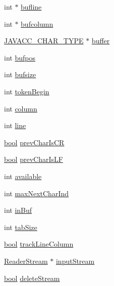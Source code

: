 \begin{DoxyCompactItemize}
\item 
int $\ast$ \hyperlink{classvhdl_1_1parser_1_1_char_stream_a6b825e1a3515c2d88228264d624d0379}{bufline}
\item 
int $\ast$ \hyperlink{classvhdl_1_1parser_1_1_char_stream_a3864d2bf9e3cfa405cab2026076cc3ad}{bufcolumn}
\item 
\hyperlink{_java_c_c_8h_a401fffd20e03e2993f9588187b65afc3}{J\+A\+V\+A\+C\+C\+\_\+\+C\+H\+A\+R\+\_\+\+T\+Y\+P\+E} $\ast$ \hyperlink{classvhdl_1_1parser_1_1_char_stream_a0214083112fc3ba8c31530cd83e8800d}{buffer}
\item 
int \hyperlink{classvhdl_1_1parser_1_1_char_stream_aa2cbb8b449e060850a7de5632f30cc25}{bufpos}
\item 
int \hyperlink{classvhdl_1_1parser_1_1_char_stream_a10f6a94a722bf34e5618d41d6072dbee}{bufsize}
\item 
int \hyperlink{classvhdl_1_1parser_1_1_char_stream_aa9408d80c650063cb31f81c9a6cd590e}{token\+Begin}
\item 
int \hyperlink{classvhdl_1_1parser_1_1_char_stream_a50828bf79317ddff0b210023624b99ff}{column}
\item 
int \hyperlink{classvhdl_1_1parser_1_1_char_stream_a1ec713a583a0ff2f32092c39101d14cb}{line}
\item 
\hyperlink{qglobal_8h_a1062901a7428fdd9c7f180f5e01ea056}{bool} \hyperlink{classvhdl_1_1parser_1_1_char_stream_a3896c04ca5e2e67a6d6d76850c89ef54}{prev\+Char\+Is\+C\+R}
\item 
\hyperlink{qglobal_8h_a1062901a7428fdd9c7f180f5e01ea056}{bool} \hyperlink{classvhdl_1_1parser_1_1_char_stream_ab6180061e753afda80477ce049c9fa64}{prev\+Char\+Is\+L\+F}
\item 
int \hyperlink{classvhdl_1_1parser_1_1_char_stream_a26311afec7fdd2e830f9021d93a07857}{available}
\item 
int \hyperlink{classvhdl_1_1parser_1_1_char_stream_a255ae084850ea92b02b420078c283490}{max\+Next\+Char\+Ind}
\item 
int \hyperlink{classvhdl_1_1parser_1_1_char_stream_afc3a2cee410152b326e23831f1f32453}{in\+Buf}
\item 
int \hyperlink{classvhdl_1_1parser_1_1_char_stream_a53d2f0014c25f1bc4f8b94bba8659dec}{tab\+Size}
\item 
\hyperlink{qglobal_8h_a1062901a7428fdd9c7f180f5e01ea056}{bool} \hyperlink{classvhdl_1_1parser_1_1_char_stream_a0d812351e15796fd8ea5bb48257794a4}{track\+Line\+Column}
\item 
\hyperlink{class_reader_stream}{Reader\+Stream} $\ast$ \hyperlink{classvhdl_1_1parser_1_1_char_stream_ae43ed68c768f19eb4a9bf8c393d9fb1d}{input\+Stream}
\item 
\hyperlink{qglobal_8h_a1062901a7428fdd9c7f180f5e01ea056}{bool} \hyperlink{classvhdl_1_1parser_1_1_char_stream_afcb58d2742ea23b5da0bbe3264d4f803}{delete\+Stream}
\end{DoxyCompactItemize}


